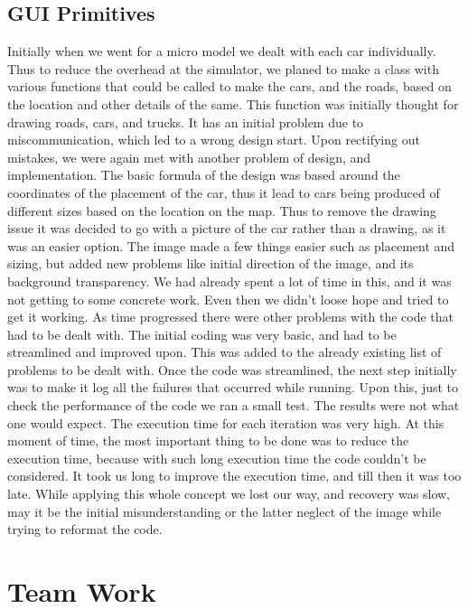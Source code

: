 \subsection{GUI Primitives}
Initially when we went for a micro  model we dealt with each car individually. Thus to reduce the overhead at the simulator, we planed to make a class with various functions that could be called to make the cars, and the roads, based on the location and other details of the same. This function was initially thought for drawing roads, cars, and trucks. It has an initial problem due to miscommunication, which led to a wrong design start. Upon rectifying out mistakes, we were again met with another problem of design, and implementation. The basic formula of the design was based around the coordinates of the placement of the car, thus it lead to cars being produced of different sizes based on the location on the map. Thus to remove the drawing issue it was decided to go with a picture of the car rather than a drawing, as it was an easier option. The image made a few things easier such as placement and sizing, but added new problems like initial direction of the image, and its background transparency. We had already spent a lot of time in this, and it was not getting to some concrete work. Even then we didn't loose hope and tried to get it working. As time progressed there were other problems with the code that had to be dealt with. The initial coding was very basic, and had to be streamlined and improved upon. This was added to the already existing list of problems to be dealt with. Once the code was streamlined, the next step initially was to make it log all the failures that occurred while running. Upon this, just to check the performance of the code we ran a small test. The results were not what one would expect. The execution time for each iteration was very high. At this moment of time, the most important thing to be done was to reduce the execution time, because with such long execution time the code couldn't be considered. It took us long to improve the execution time, and till then it was too late. While applying this whole concept we lost our way, and recovery was slow, may it be the initial misunderstanding or the latter neglect of the image while trying to reformat the code.

\section{Team Work}

